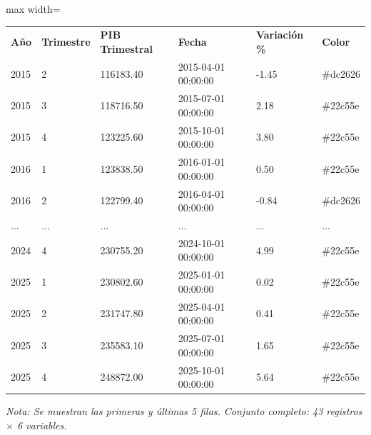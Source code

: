 

\begin{table}[htbp]

\centering

\begin{adjustbox}{max width=\textwidth}

\begin{tabular}{llllll}

\rowcolor{ThemeBackground}
\rule{0pt}{0.45cm}
\textcolor{ThemeGold}{\bfseries Año} & \textcolor{ThemeGold}{\bfseries Trimestre} & \textcolor{ThemeGold}{\bfseries PIB Trimestral} & \textcolor{ThemeGold}{\bfseries Fecha} & \textcolor{ThemeGold}{\bfseries Variación \%} & \textcolor{ThemeGold}{\bfseries Color} \\

2015 & 2 & 116183.40 & 2015-04-01 00:00:00 & -1.45 & \#dc2626 \\
2015 & 3 & 118716.50 & 2015-07-01 00:00:00 & 2.18 & \#22c55e \\
2015 & 4 & 123225.60 & 2015-10-01 00:00:00 & 3.80 & \#22c55e \\
2016 & 1 & 123838.50 & 2016-01-01 00:00:00 & 0.50 & \#22c55e \\
2016 & 2 & 122799.40 & 2016-04-01 00:00:00 & -0.84 & \#dc2626 \\
... & ... & ... & ... & ... & ... \\
2024 & 4 & 230755.20 & 2024-10-01 00:00:00 & 4.99 & \#22c55e \\
2025 & 1 & 230802.60 & 2025-01-01 00:00:00 & 0.02 & \#22c55e \\
2025 & 2 & 231747.80 & 2025-04-01 00:00:00 & 0.41 & \#22c55e \\
2025 & 3 & 235583.10 & 2025-07-01 00:00:00 & 1.65 & \#22c55e \\
2025 & 4 & 248872.00 & 2025-10-01 00:00:00 & 5.64 & \#22c55e \\
\bottomrule
\end{tabular}

\end{adjustbox}

\vspace{0.15cm}
{\raggedright\sffamily\footnotesize\color{ThemeMuted}
\textit{Nota: Se muestran las primeras y últimas 5 filas. Conjunto completo: 43 registros $\times$ 6 variables.}}

\end{table}
